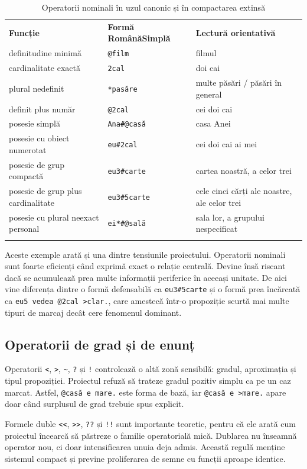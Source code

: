 \documentclass[12pt,onecolumn,letterpaper]{article}
\newcommand{\rs}[1]{\texttt{#1}}
\begin{document}
\begin{longtable}{@{}p{3.2cm}p{4.7cm}p{4.2cm}@{}}
\rowcolor{RSGray}
\textbf{Funcție} & \textbf{Formă RomânăSimplă} & \textbf{Lectură orientativă} \\
definitudine minimă & \rs{@film} & filmul \\
cardinalitate exactă & \rs{2cal} & doi cai \\
plural nedefinit & \rs{*pasăre} & multe păsări / păsări în general \\
definit plus număr & \rs{@2cal} & cei doi cai \\
posesie simplă & \rs{Ana\#@casă} & casa Anei \\
posesie cu obiect numerotat & \rs{eu\#2cal} & cei doi cai ai mei \\
posesie de grup compactă & \rs{eu3\#carte} & cartea noastră, a celor trei \\
posesie de grup plus cardinalitate & \rs{eu3\#5carte} & cele cinci cărți ale noastre, ale celor trei \\
posesie cu plural neexact personal & \rs{ei*\#@sală} & sala lor, a grupului nespecificat \\
\bottomrule
\caption{Operatorii nominali în uzul canonic și în compactarea extinsă}
\end{longtable}

Aceste exemple arată și una dintre tensiunile proiectului. Operatorii nominali
sunt foarte eficienți când exprimă exact o relație centrală. Devine însă riscant
dacă se acumulează prea multe informații periferice în aceeași unitate. De aici
vine diferența dintre o formă defensabilă ca \rs{eu3\#5carte} și o formă prea
încărcată ca \rs{eu5 vedea @2cal >clar.}, care amestecă într-o propoziție scurtă
mai multe tipuri de marcaj decât cere fenomenul dominant.

\subsection{Operatorii de grad și de enunț}

Operatorii \rs{<}, \rs{>}, \rs{\textasciitilde{}}, \rs{?} și \rs{!}
controlează o altă zonă sensibilă: gradul, aproximația și tipul propoziției.
Proiectul refuză să trateze gradul pozitiv simplu ca pe un caz marcat. Astfel,
\rs{@casă e mare.} este forma de bază, iar \rs{@casă e >mare.} apare doar când
surplusul de grad trebuie spus explicit.

Formele duble \rs{<<}, \rs{>>}, \rs{??} și \rs{!!} sunt importante teoretic,
pentru că ele arată cum proiectul încearcă să păstreze o familie operatorială
mică. Dublarea nu înseamnă operator nou, ci doar intensificarea unuia deja
admis. Această regulă menține sistemul compact și previne proliferarea de semne
cu funcții aproape identice.
\end{document}

